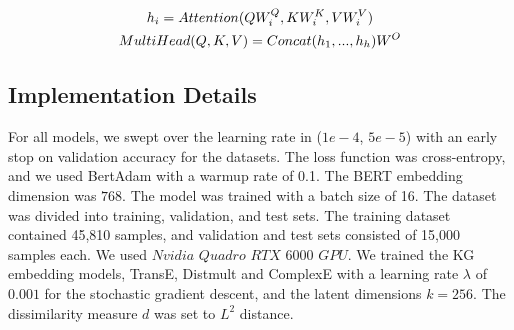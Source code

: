 \vspace{-1.2em}
\begin{equation}
\begin{gathered}
    h_i = Attention(Q W^Q_i, K W^K_i, V W^V_i) \\ 
    MultiHead(Q, K, V) = Concat(h_1, ..., h_h)W^O 
\end{gathered} 
\vspace{-0.5em}
\label{eqn-attn}
\end{equation}

\subsection{Implementation Details}
\label{implementation-details}
For all models, we swept over the learning rate in ($1e-4$, $5e-5$) with an early stop on validation accuracy for the datasets. The loss function was cross-entropy, and
we used BertAdam \cite{devlin2019google} with a warmup rate of 0.1. The BERT embedding dimension was $768$. The model was trained with a batch size of 16. The dataset was divided into training, validation, and test sets. The training dataset contained 45,810 samples, and validation and test sets consisted of 15,000 samples each.
We used $Nvidia$ $Quadro$ $RTX$ $6000$ $GPU$.
We trained the KG embedding models, TransE, Distmult and ComplexE with a learning rate $\lambda$ of  $0.001$ for the stochastic gradient descent, and the latent dimensions $k = 256$. The dissimilarity measure $d$ was set to $L^2$ distance. 



